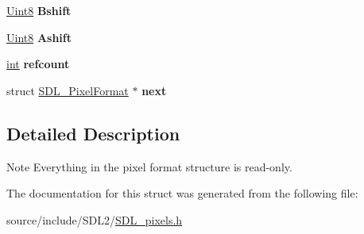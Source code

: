 \begin{DoxyCompactItemize}
\item 
\hypertarget{struct_s_d_l___pixel_format_a4212574b67529628d8822ed4eb109754}{}\hyperlink{_s_d_l__stdinc_8h_a2944638813a090aa23e62f4da842c3e2}{Uint8} {\bfseries Bshift}\label{struct_s_d_l___pixel_format_a4212574b67529628d8822ed4eb109754}

\item 
\hypertarget{struct_s_d_l___pixel_format_ac3c4ffa0de1f2c94040340deede3bf46}{}\hyperlink{_s_d_l__stdinc_8h_a2944638813a090aa23e62f4da842c3e2}{Uint8} {\bfseries Ashift}\label{struct_s_d_l___pixel_format_ac3c4ffa0de1f2c94040340deede3bf46}

\item 
\hypertarget{struct_s_d_l___pixel_format_a23be8060443d58064a720a4e2ef31729}{}\hyperlink{_s_d_l__thread_8h_a6a64f9be4433e4de6e2f2f548cf3c08e}{int} {\bfseries refcount}\label{struct_s_d_l___pixel_format_a23be8060443d58064a720a4e2ef31729}

\item 
\hypertarget{struct_s_d_l___pixel_format_a1953b66c817116bf81bae4873ee6bce5}{}struct \hyperlink{struct_s_d_l___pixel_format}{S\+D\+L\+\_\+\+Pixel\+Format} $\ast$ {\bfseries next}\label{struct_s_d_l___pixel_format_a1953b66c817116bf81bae4873ee6bce5}

\end{DoxyCompactItemize}


\subsection{Detailed Description}
\begin{DoxyNote}{Note}
Everything in the pixel format structure is read-\/only. 
\end{DoxyNote}


The documentation for this struct was generated from the following file\+:\begin{DoxyCompactItemize}
\item 
source/include/\+S\+D\+L2/\hyperlink{_s_d_l__pixels_8h}{S\+D\+L\+\_\+pixels.\+h}\end{DoxyCompactItemize}
